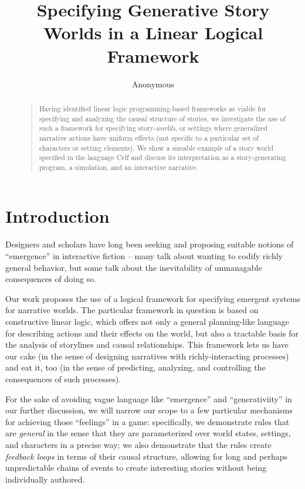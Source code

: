 \documentclass[letterpaper]{article}
\begin{document}
%
\title{Specifying Generative Story Worlds in a Linear Logical Framework}
\author{Anonymous} %
\maketitle
\begin{abstract}
\begin{quote}
Having identified linear logic programming-based frameworks as viable for
specifying and analyzing the causal structure of stories, we investigate
the use of such a framework for specifying story-{\em worlds}, or
settings where generalized narrative actions have uniform effects (not
specific to a particular set of characters or setting elements). We show a
sizeable example of a story world specified in the language Celf and
discuss its interpretation as a story-generating program, a simulation, and
an interactive narrative.
\end{quote}
\end{abstract}

\section{Introduction}

% 

Designers and scholars have long been seeking and proposing suitable
notions of ``emergence'' in interactive fiction -- many talk about wanting
to codify richly general behavior, but some talk about the inevitability of
unmanagable consequences of doing so. 

Our work proposes the use of a logical framework for specifying emergent
systems for narrative worlds. The particular framework in question is based
on constructive linear logic, which offers not only a general planning-like
language for describing actions and their effects on the world, but also a
tractable basis for the analysis of storylines and causal relationships.
This framework lets us have our cake (in the sense of designing narratives
with richly-interacting processes) and eat it, too (in the sense of
predicting, analyzing, and controlling the consequences of such processes).

For the sake of avoiding vague language like ``emergence'' and
``generativiity'' in our further discussion, we will narrow our scope to a
few particular mechanisms for achieving those ``feelings'' in a game:
specifically, we demonstrate rules that are {\em general} in the sense that
they are parameterized over world states, settings, and characters in a
precise way; we also demonstrate that the rules create {\em feedback loops}
in terms of their causal structure, allowing for long and perhaps
unpredictable chains of events to create interesting stories without being
individually authored.
\end{document}
